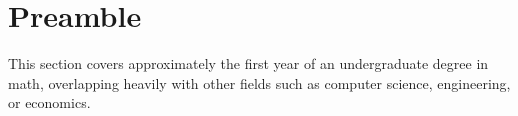 \documentclass[../../../main.tex]{subfiles}
\begin{document}
\section*{Preamble}

This section covers approximately the first year of an undergraduate degree in math, overlapping heavily with other fields such as computer science, engineering, or economics.
\end{document}
